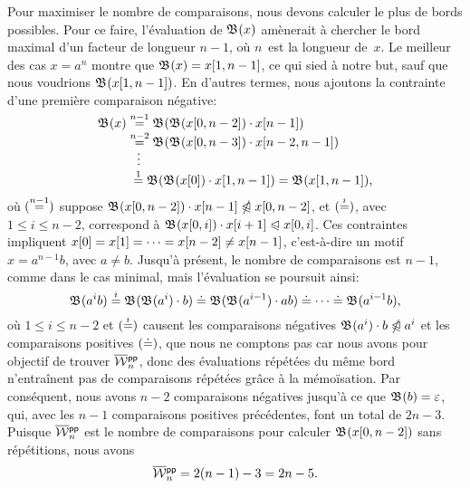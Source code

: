 
Pour maximiser le nombre de comparaisons, nous
devons calculer le plus de bords possibles. Pour ce faire,
l'évaluation de \(\mathfrak{B}^{}(x)\) amènerait à chercher le bord maximal
d'un facteur de longueur \(n-1\), où \(n\)~est la longueur
de~\(x\). Le meilleur des cas \(x=a^{n}\) montre que \(\mathfrak{B}^{}(x) =
{x}[{1,n-1}]\), ce qui sied à notre but, sauf que nous voudrions
\(\mathfrak{B}^{}({x}[{1,n-1}])\). En d'autres termes, nous ajoutons la
contrainte d'une première comparaison négative:
\begin{align*}
\mathfrak{B}^{}(x)
&\mathrel{\stackrel{\smash{n-1}}{=}} \mathfrak{B}^{}(\mathfrak{B}^{}({x}[{0,n-2}]) \cdot {x}[{n-1}])\\
&\mathrel{\stackrel{\smash{n-2}}{=}} \mathfrak{B}^{}(\mathfrak{B}^{}({x}[{0,n-3}]) \cdot {x}[{n-2,n-1}])\\
&\;\;\;\smash{\vdots}\\
&\;\mathrel{\stackrel{\smash[t]{1}}{=}}
  \mathfrak{B}^{}(\mathfrak{B}^{}({x}[{0}]) \cdot {x}[{1,n-1}])
= \mathfrak{B}^{}({x}[{1,n-1}]),
\end{align*}
où \((\smash{\mathrel{\stackrel{\smash{n-1}}{=}}})\) suppose \(\mathfrak{B}^{}({x}[{0,n-2}]) \cdot
{x}[{n-1}] \mathrel{\ntrianglelefteqslant} {x}[{0,n-2}]\), et \((\smash{\mathrel{\stackrel{\smash{i}}{=}}})\), avec
\(1 \leqslant i \leqslant n-2\), correspond à
\(\mathfrak{B}^{}({x}[{0,i}]) \cdot {x}[{i+1}] \mathrel{\trianglelefteqslant}
{x}[{0,i}]\). Ces contraintes impliquent \({x}[{0}] = {x}[{1}] =
\dots = {x}[{n-2}] \neq {x}[{n-1}]\), c'est-à-dire un motif
\(x=a^{n-1}b\), avec \(a \neq b\). Jusqu'à présent, le nombre de
comparaisons est \(n-1\), comme dans le cas minimal, mais l'évaluation
se poursuit ainsi:
\begin{equation*}
\mathfrak{B}^{}(a^{i}b)
\mathrel{\stackrel{\smash{i}}{=}} \mathfrak{B}^{}(\mathfrak{B}^{}(a^{i}) \cdot b)\\
\doteq \mathfrak{B}^{}(\mathfrak{B}^{}(a^{i-1}) \cdot ab)\\
\doteq \dots \doteq \mathfrak{B}^{}(a^{i-1}b),
\end{equation*}
où \(1 \leqslant i \leqslant n-2\) et \((\smash{\mathrel{\stackrel{\smash{i}}{=}}})\) causent
les comparaisons négatives \({\mathfrak{B}^{}(a^{i}) \cdot b \mathrel{\ntrianglelefteqslant} a^{i}}\)
et les comparaisons positives \((\smash{\doteq})\), que nous ne
comptons pas car nous avons pour objectif de trouver
\(\OW{\fun{pp}}{n}\), donc des
évaluations répétées du même bord n'entraînent pas de comparaisons
répétées grâce à la mémoïsation. Par conséquent,
nous avons \(n-2\) comparaisons négatives jusqu'à ce que
\(\mathfrak{B}^{}(b) = \varepsilon\), qui, avec les \(n-1\) comparaisons
positives précédentes, font un total de \(2n-3\). Puisque
\(\OW{\fun{pp}}{n}\) est le nombre de comparaisons pour calculer
\(\mathfrak{B}^{}({x}[{0,n-2}])\) sans répétitions, nous avons
\begin{equation*}
\belowdisplayskip=0pt
\OW{\fun{pp}}{n} = 2(n-1)-3 = 2n - 5.
\end{equation*}

